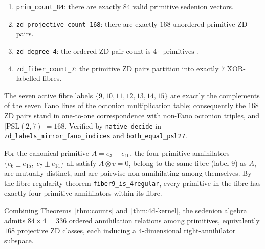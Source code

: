 \documentclass{article}
\begin{document}
\begin{theorem}
\label{thm:counts}
\begin{enumerate}
  \item \texttt{prim\_count\_84}: there are exactly $84$ valid primitive sedenion vectors.
  \item \texttt{zd\_projective\_count\_168}: there are exactly $168$ unordered primitive ZD pairs.
  \item \texttt{zd\_degree\_4}: the ordered ZD pair count is $4 \cdot |\text{primitives}|$.
  \item \texttt{zd\_fiber\_count\_7}: the primitive ZD pairs partition into exactly $7$ XOR-labelled fibres.
\end{enumerate}
\end{theorem}

\begin{theorem}
\label{thm:bridge}
The seven active fibre labels $\{9,10,11,12,13,14,15\}$ are exactly the
complements of the seven Fano lines of the octonion multiplication table;
consequently the $168$ ZD pairs stand in one-to-one correspondence with
non-Fano octonion triples, and $|\mathrm{PSL}(2,7)| = 168$.
Verified by \texttt{native\_decide} in \texttt{zd\_labels\_mirror\_fano\_indices}
and \texttt{both\_equal\_psl27}.
\end{theorem}

\begin{theorem}
\label{thm:4d-kernel}
For the canonical primitive $A = e_3 + e_{10}$, the four primitive annihilators
$\{e_6 \pm e_{15},\; e_7 \pm e_{14}\}$ all satisfy
$A \otimes v = 0$, belong to the same fibre (label $9$) as $A$, are mutually
distinct, and are pairwise non-annihilating among themselves. By the fibre
regularity theorem \texttt{fiber9\_is\_4regular}, every primitive in the fibre
has exactly four primitive annihilators within its fibre.
\end{theorem}

\begin{theorem}
\label{thm:capacity}
Combining Theorems~\ref{thm:counts} and~\ref{thm:4d-kernel}, the sedenion
algebra admits $84 \times 4 = 336$ ordered annihilation relations among
primitives, equivalently $168$ projective ZD classes, each inducing a
$4$-dimensional right-annihilator subspace.
\end{theorem}
\end{document}
